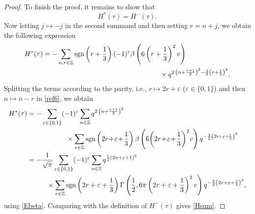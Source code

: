 \documentclass[12pt,reqno]{amsart}
\renewcommand{\b}{\beta}
\renewcommand{\t}{\tau}
\renewcommand{\(}{\left\(}
\renewcommand{\)}{\right\)}
\newcommand{\os}[2]{\overset{#1}{#2}}
\numberwithin{equation}{section}
\theoremstyle{plain}
\theoremstyle{definition}
\numberwithin{equation}{section}
\begin{document}
\begin{proof}
To finish the proof, it remains to show that
\begin{equation}\label{Hsum}
H^*(\t)=H^{-}(\t).
\end{equation}
Now letting $j\mapsto -j$ in the second summand and then setting $r=n+j$, we obtain the following expression
\begin{align}\label{ref6}
H^{*}(\t)%
&=-\sum_{n,r\in \mathbb{Z}}\text{sgn}\left(r+\frac 13\right)(-1)^{r}\b\left(6\left(r+\frac 13\right)^2 v\right)\nonumber\\
&\hspace{6 cm}\times q^{2\,\left(n+\frac{r+1}{2}\right)^2-\frac 32\left(r+\frac 13\right)^2}.
\end{align}
Splitting the terms according to the parity, i.e., $r\mapsto 2r+\varepsilon$ ($\varepsilon\in\{0,1\}$) and then $n\mapsto n-r$ in \eqref{ref6}, we obtain %
\begin{align*}
H^*(\t)&=-
\sum_{\varepsilon\in\{0,1\}}(-1)^{\varepsilon}\sum_{n\in \mathbb{Z}}q^{2\,\left(n+\frac{\varepsilon+1}{2}\right)^2}\\
&\hspace{2 cm}\times \sum_{r\in \mathbb{Z}}\text{sgn}\left(2r\!+\!\varepsilon\!+\!\frac 13\right)\b\left(6\!\left(2r\!+\!\varepsilon\!+\!\frac 13\right)^2\! v\right)q^{-\frac 32\left(2r\!+\varepsilon+\!\frac 13\right)^2}\\
&=-\frac{1}{\sqrt{\pi}}\sum_{\varepsilon\in\{0,1\}}(-1)^{\varepsilon}\sum_{n\in \mathbb{Z}}q^{\frac 12\left(2n+\varepsilon+1\right)^2}\\
&\hspace{1 cm}\times\sum_{r\in \mathbb{Z}}\text{sgn}\left(2r+\varepsilon+\frac 13\right) \Gamma\left(\frac 12,6\pi\left(2r+\varepsilon+\frac 13\right)^2v\right)q^{-\frac 32\left(2r+\varepsilon+\frac 13\right)^2},
\end{align*}
using \eqref{Ebeta}. Comparing with the definition of $H^{-}(\t)$ gives \eqref{Hsum}.\qedhere 

\end{proof}
\end{document}
